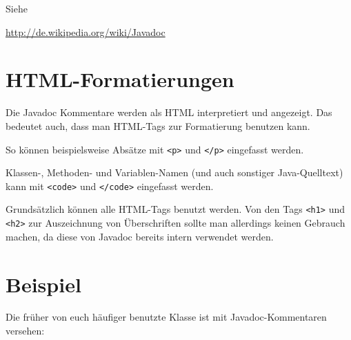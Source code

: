 Siehe

\url{http://de.wikipedia.org/wiki/Javadoc}


\section{HTML-Formatierungen}

Die Javadoc Kommentare werden als HTML interpretiert und angezeigt. Das bedeutet
auch, dass man HTML-Tags zur Formatierung benutzen kann.

So können beispielsweise Absätze mit \lstinline|<p>| und \lstinline|</p>|
eingefasst werden.

Klassen-, Methoden- und Variablen-Namen (und auch sonstiger Java-Quelltext) kann
mit \lstinline|<code>| und \lstinline|</code>| eingefasst werden.

Grundsätzlich können alle HTML-Tags benutzt werden. Von  den
Tags \lstinline|<h1>| und \lstinline|<h2>| zur Auszeichnung von Überschriften
sollte man allerdings keinen Gebrauch machen, da diese von Javadoc bereits
intern verwendet werden.


\section{Beispiel}

Die früher von euch häufiger benutzte Klasse  ist mit
Javadoc-Kommentaren versehen:

